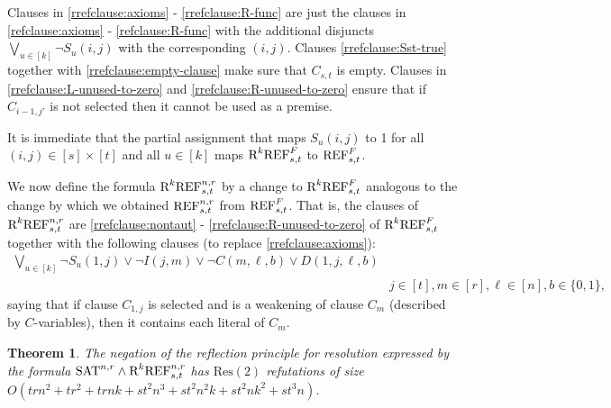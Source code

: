 \documentclass[10pt,a4paper]{article}
\newtheorem{theorem}{Theorem}
\theoremstyle{remark}
\newtheorem*{switching lemma}{Switching Lemma}
\newtheorem*{open problem}{Open Problem}
\theoremstyle{definition}
\begin{document}
Clauses in \eqref{rrefclause:axioms} - \eqref{rrefclause:R-func} are just the clauses in \eqref{refclause:axioms} - \eqref{refclause:R-func} with the additional disjuncts $\bigvee_{u \in [k]} \neg S_u(i,j)$ with the corresponding $(i,j)$. Clauses \eqref{rrefclause:Sst-true} together with \eqref{rrefclause:empty-clause} make sure that $C_{s,t}$ is empty. Clauses in \eqref{rrefclause:L-unused-to-zero} and \eqref{rrefclause:R-unused-to-zero} ensure that if $C_{i-1,j'}$ is not selected then it cannot be used as a premise.

It is immediate that the partial assignment that maps $S_u(i,j)$ to 1 for all $(i,j) \in [s] \times [t]$ and all $u \in [k]$ maps $\textnormal{R}^k\textnormal{REF}^{F}_{s,t}$ to $\textnormal{REF}^{F}_{s,t}$.

We now define the formula $\textnormal{R}^k\textnormal{REF}^{n,r}_{s,t}$ by a change to $\textnormal{R}^k\textnormal{REF}^{F}_{s,t}$ analogous to the change by which we obtained $\textnormal{REF}^{n,r}_{s,t}$ from $\textnormal{REF}^{F}_{s,t}$. That is, the clauses of $\textnormal{R}^k\textnormal{REF}^{n,r}_{s,t}$ are \eqref{rrefclause:nontaut} - \eqref{rrefclause:R-unused-to-zero} of $\textnormal{R}^k\textnormal{REF}^{F}_{s,t}$ together with the following clauses (to replace \eqref{rrefclause:axioms}):
\begin{equation}
\begin{split}
\label{rrefclause-n-r:axioms}
\bigvee_{u \in [k]} \neg S_u(1,j) \lor \neg I(j,m) \lor \neg C(m,\ell,b) \lor D(1,j,\ell,b)  \\
  & j \! \in \! [t], m \! \in \! [r], \ell \! \in \! [n], b \! \in \! \{0,1\},
\end{split}
\end{equation}
saying that if clause $C_{1,j}$ is selected and is a weakening of clause $C_m$ (described by $C$-variables), then it contains each literal of $C_m$.


\begin{theorem}
\label{thm:refl-princ-Upper-bound}
The negation of the reflection principle for resolution expressed by the formula $\textnormal{SAT}^{n,r} \land \textnormal{R}^k\textnormal{REF}^{n,r}_{s,t}$ has $\text{Res}(2)$ refutations of size $O(trn^2 + tr^2 + trnk + st^2n^3 + st^2n^2k + st^2nk^2 + st^3n)$.
\end{theorem}
\end{document}
